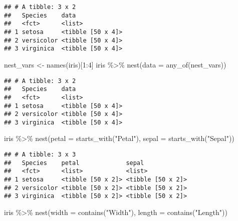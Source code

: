 \documentclass[
]{book}
\newenvironment{Shaded}{\begin{snugshade}}{\end{snugshade}}
\newcommand{\AttributeTok}[1]{\textcolor[rgb]{0.77,0.63,0.00}{#1}}
\newcommand{\DecValTok}[1]{\textcolor[rgb]{0.00,0.00,0.81}{#1}}
\newcommand{\FunctionTok}[1]{\textcolor[rgb]{0.00,0.00,0.00}{#1}}
\newcommand{\NormalTok}[1]{#1}
\newcommand{\OtherTok}[1]{\textcolor[rgb]{0.56,0.35,0.01}{#1}}
\newcommand{\SpecialCharTok}[1]{\textcolor[rgb]{0.00,0.00,0.00}{#1}}
\newcommand{\StringTok}[1]{\textcolor[rgb]{0.31,0.60,0.02}{#1}}
\begin{document}
\begin{verbatim}
## # A tibble: 3 x 2
##   Species    data             
##   <fct>      <list>           
## 1 setosa     <tibble [50 x 4]>
## 2 versicolor <tibble [50 x 4]>
## 3 virginica  <tibble [50 x 4]>
\end{verbatim}

\begin{Shaded}
\begin{Highlighting}[]
\NormalTok{nest\_vars }\OtherTok{\textless{}{-}} \FunctionTok{names}\NormalTok{(iris)[}\DecValTok{1}\SpecialCharTok{:}\DecValTok{4}\NormalTok{]}
\NormalTok{iris }\SpecialCharTok{\%\textgreater{}\%} 
  \FunctionTok{nest}\NormalTok{(}\AttributeTok{data =} \FunctionTok{any\_of}\NormalTok{(nest\_vars))}
\end{Highlighting}
\end{Shaded}

\begin{verbatim}
## # A tibble: 3 x 2
##   Species    data             
##   <fct>      <list>           
## 1 setosa     <tibble [50 x 4]>
## 2 versicolor <tibble [50 x 4]>
## 3 virginica  <tibble [50 x 4]>
\end{verbatim}

\begin{Shaded}
\begin{Highlighting}[]
\NormalTok{iris }\SpecialCharTok{\%\textgreater{}\%}
  \FunctionTok{nest}\NormalTok{(}\AttributeTok{petal =} \FunctionTok{starts\_with}\NormalTok{(}\StringTok{"Petal"}\NormalTok{), }\AttributeTok{sepal =} \FunctionTok{starts\_with}\NormalTok{(}\StringTok{"Sepal"}\NormalTok{))}
\end{Highlighting}
\end{Shaded}

\begin{verbatim}
## # A tibble: 3 x 3
##   Species    petal             sepal            
##   <fct>      <list>            <list>           
## 1 setosa     <tibble [50 x 2]> <tibble [50 x 2]>
## 2 versicolor <tibble [50 x 2]> <tibble [50 x 2]>
## 3 virginica  <tibble [50 x 2]> <tibble [50 x 2]>
\end{verbatim}

\begin{Shaded}
\begin{Highlighting}[]
\NormalTok{iris }\SpecialCharTok{\%\textgreater{}\%}
  \FunctionTok{nest}\NormalTok{(}\AttributeTok{width =} \FunctionTok{contains}\NormalTok{(}\StringTok{"Width"}\NormalTok{), }\AttributeTok{length =} \FunctionTok{contains}\NormalTok{(}\StringTok{"Length"}\NormalTok{))}
\end{Highlighting}
\end{Shaded}
\end{document}

